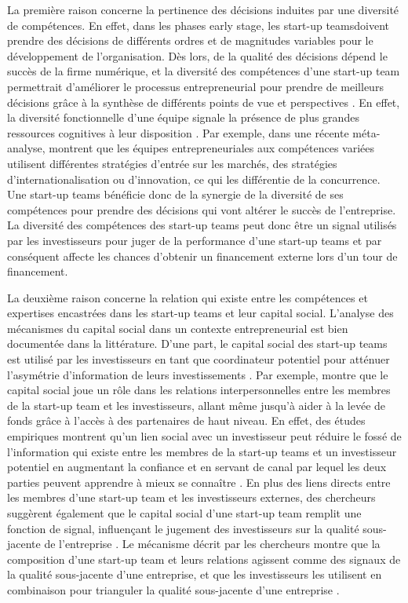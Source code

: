 \documentclass[12pt]{article}
\begin{document}
La première raison concerne la pertinence des décisions induites par une diversité de compétences. En effet, dans les phases early stage, les start-up teamsdoivent prendre des décisions de différents ordres et de magnitudes variables pour le développement de l'organisation. Dès lors, de la qualité des décisions dépend le succès de la firme numérique, et la diversité des compétences d'une start-up team permettrait d'améliorer le processus entrepreneurial pour prendre de meilleurs décisions grâce à la synthèse de différents points de vue et perspectives \citep{sirmon2011resource}. En effet, la diversité fonctionnelle d'une équipe signale la présence de plus grandes ressources cognitives à leur disposition \citep{bunderson2002comparing}. Par exemple, dans une récente méta-analyse, \citet{jin2017entrepreneurial} montrent que les équipes entrepreneuriales aux compétences variées utilisent différentes stratégies d'entrée sur les marchés, des stratégies d'internationalisation ou d'innovation, ce qui les différentie de la concurrence. Une start-up teams bénéficie donc de la synergie de la diversité de ses compétences pour prendre des décisions qui vont altérer le succès de l'entreprise. La diversité des compétences des start-up teams peut donc être un signal utilisés par les investisseurs pour juger de la performance d'une start-up teams et par conséquent affecte les chances d'obtenir un financement externe lors d'un tour de financement.

La deuxième raison concerne la relation qui existe entre les compétences et expertises encastrées dans les start-up teams et leur capital social. L'analyse des mécanismes du capital social dans un contexte entrepreneurial est bien documentée dans la littérature. D'une part, le capital social des start-up teams est utilisé par les investisseurs en tant que coordinateur potentiel pour atténuer l'asymétrie d'information de leurs investissements \citep{ko2018signaling}. Par exemple, \citet{shane2002network} montre que le capital social joue un rôle dans les relations interpersonnelles entre les membres de la start-up team et les investisseurs, allant même jusqu'à aider à la levée de fonds grâce à l'accès à des partenaires de haut niveau. En effet, des études empiriques montrent qu'un lien social avec un investisseur peut réduire le fossé de l'information qui existe entre les membres de la start-up teams et un investisseur potentiel en augmentant la confiance et en servant de canal par lequel les deux parties peuvent apprendre à mieux se connaître \citep{huang2017resources, shane2002network, shane2002organizational}. En plus des liens directs entre les membres d'une start-up team et les investisseurs externes, des chercheurs suggèrent également que le capital social d'une start-up team remplit une fonction de signal, influençant le jugement des investisseurs sur la qualité sous-jacente de l'entreprise \citep{hoenig2015quality, shane2002organizational}. Le mécanisme décrit par les chercheurs montre que la composition d'une start-up team et leurs relations agissent comme des signaux de la qualité sous-jacente d'une entreprise, et que les investisseurs les utilisent en combinaison pour trianguler la qualité sous-jacente d'une entreprise \citep{plummer2016better, semrau2014exactly}.
\end{document}
